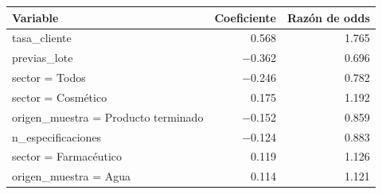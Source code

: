 \begin{tabular}{lrr}
\toprule
Variable & Coeficiente & Razón de odds \\
\midrule
tasa\_cliente & 0.568 & 1.765 \\
previas\_lote & $-$0.362 & 0.696 \\
sector = Todos & $-$0.246 & 0.782 \\
sector = Cosmético & 0.175 & 1.192 \\
origen\_muestra = Producto terminado & $-$0.152 & 0.859 \\
n\_especificaciones & $-$0.124 & 0.883 \\
sector = Farmacéutico & 0.119 & 1.126 \\
origen\_muestra = Agua & 0.114 & 1.121 \\
\bottomrule
\end{tabular}
